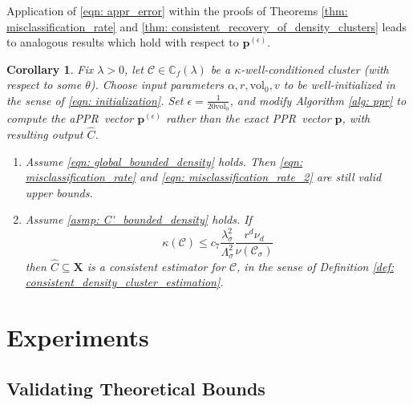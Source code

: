 \documentclass{article}
\newcommand{\vol}{\mathrm{vol}}
\newcommand{\1}{\mathbf{1}}
\newcommand{\pbf}{\mathbf{p}}
\newcommand{\Xbf}{\mathbf{X}}
\newcommand{\Cbb}{\mathbb{C}}
\newcommand{\Cset}{\mathcal{C}}
\newcommand{\Csig}{\Cset_{\sigma}}
\newcommand{\pprspace}{{\sc PPR~}}
\theoremstyle{aldenthm}
\newtheorem{corollary}{Corollary}
\theoremstyle{aldenrmrk}
\begin{document}
Application of \eqref{eqn: appr_error} within the proofs of Theorems \ref{thm: misclassification_rate} and \ref{thm: consistent_recovery_of_density_clusters} leads to analogous results which hold with respect to $\pbf^{(\epsilon)}$.

\begin{corollary}
	\label{cor: appr}
	Fix $\lambda > 0$, let $\Cset \in \Cbb_f(\lambda)$ be a $\kappa$-well-conditioned cluster (with respect to some $\theta$). Choose input parameters $\alpha, r, \vol_0, v$ to be well-initialized in the sense of \eqref{eqn: initialization}. Set $\epsilon = \frac{1}{20 \vol_0}$, and modify Algorithm \ref{alg: ppr} to compute the a\pprspace vector $\pbf^{(\epsilon)}$ rather than the exact \pprspace vector $\pbf$, with resulting output $\widehat{C}$.
	\begin{enumerate}
		\item Assume \eqref{eqn: global_bounded_density} holds. Then \eqref{eqn: misclassification_rate} and \eqref{eqn: misclassification_rate_2} are still valid upper bounds.
		\item Assume \ref{asmp: C'_bounded_density} holds. If
		\begin{equation*}
		\kappa(\Cset) \leq c_7 \frac{\lambda_{\sigma}^2}{\Lambda_{\sigma}^2} \frac{r^d \nu_d}{\nu(\Csig)}
		\end{equation*}
		then $\widehat{C} \subseteq \Xbf$ is a consistent estimator for $\Cset$, in the sense of Definition \ref{def: consistent_density_cluster_estimation}.
	\end{enumerate}
\end{corollary}

\section{Experiments}
\label{sec: experiments}

\subsection{Validating Theoretical Bounds}
\end{document}
